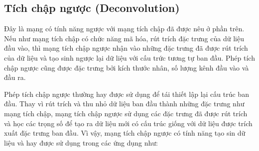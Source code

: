 


\subsection{Tích chập ngược (Deconvolution)}

Đây là mạng có tính năng ngược với mạng tích chập đã được nêu ở phần trên. Nếu như mạng tích chập có chức năng mã hóa, rút trích đặc trưng của dữ liệu đầu vào, thì mạng tích chập ngược nhận vào những đặc trưng đã được rút trích của dữ liệu và tạo sinh ngược lại dữ liệu với cấu trức tương tự ban đầu. Phép tích chập ngược cũng được đặc trưng bởi kích thước nhân, số lượng kênh đầu vào và đầu ra.

Phép tích chập ngược thường hay được sử dụng để tái thiết lập lại cấu trúc ban đầu. Thay vì rút trích và thu nhỏ dữ liệu ban đầu thành những đặc trưng như mạng tích chập, mạng tích chập ngược sử dụng các đặc trưng đã được rút trích và học các trọng số để tạo ra dữ liệu mới có cấu trúc giống với dữ liệu được trích xuất đặc trưng ban đầu. Vì vậy, mạng tích chập ngược có tính năng tạo sin dữ liệu và hay được sử dụng trong các ứng dụng như:

